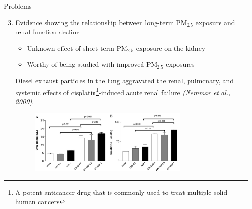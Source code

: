 \documentclass{beamer}
\begin{document}
\begin{frame}{Problems}
    \begin{enumerate}
        \setcounter{enumi}{2}
        \item<1-> Evidence showing the relationship between long-term PM$_{2.5}$ exposure and renal function decline
            \begin{itemize}
                \item<2-> \textcolor[rgb]{1,0.4,0}{Unknown effect of short-term PM$_{2.5}$ exposure on the kidney}
                \item<3-> \textcolor[rgb]{1,0.4,0}{Worthy of being studied with improved PM$_{2.5}$ exposures}
            \end{itemize}
         \textcolor[rgb]{0.1,0.1,0.6}{\small Diesel exhaust particles in the lung aggravated the renal, pulmonary, and systemic effects of cisplatin\footnote{A potent anticancer drug that is commonly used to treat multiple solid human cancers}-induced acute renal failure \textit{(Nemmar et al., 2009)}.}
         \begin{figure}
             \centering
             \includegraphics[width=0.75\textwidth]{img/appendix/cp_dep.jpg}
         \end{figure}
    \end{enumerate}
\end{frame}
\end{document}
